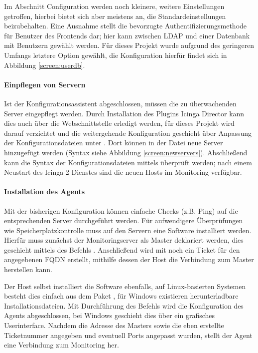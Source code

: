 Im Abschnitt \glqq{}Configuration\grqq{} werden noch kleinere, weitere Einstellungen getroffen, hierbei bietet sich aber meistens an, die Standardeinstellungen beizubehalten. Eine Ausnahme stellt die bevorzugte Authentifizierungsmethode für Benutzer des Frontends dar; hier kann zwischen \ac{LDAP} und einer Datenbank mit Benutzern gewählt werden. Für dieses Projekt wurde aufgrund des geringeren Umfangs letztere Option gewählt, die Konfiguration hierfür findet sich in Abbildung \ref{screen:userdb}.

\paragraph{Einpflegen von Servern}
Ist der Konfigurationsassistent abgeschlossen, müssen die zu überwachenden Server eingepflegt werden. Durch Installation des Plugins \glqq{}Icinga Director\grqq{} kann dies auch über die Webschnittstelle erledigt werden, für dieses Projekt wird darauf verzichtet und die weitergehende Konfiguration geschieht über Anpassung der Konfigurationsdateien unter . Dort können in der Datei  neue Server hinzugefügt werden (Syntax siehe Abbildung \ref{screen:newservers}). Abschließend kann die Syntax der Konfigurationsdateien mittels  überprüft werden; nach einem Neustart des \glqq{}Icinga 2\grqq{} Dienstes sind die neuen Hosts im Monitoring verfügbar.

\paragraph{Installation des Agents}
Mit der bisherigen Konfiguration können einfache Checks (z.B. Ping) auf die entsprechenden Server durchgeführt werden. Für aufwendigere Überprüfungen wie Speicherplatzkontrolle muss auf den Servern eine Software installiert werden. Hierfür muss zunächst der Monitoringserver als \glqq{}Master\grqq{} deklariert werden, dies geschieht mittels des Befehls . Anschließend wird mit  noch ein \glqq{}Ticket\grqq{} für den angegebenen \ac{FQDN} erstellt, mithilfe dessen der Host die Verbindung zum Master herstellen kann.

Der Host selbst installiert die Software ebenfalls, auf Linux-basierten Systemen besteht dies einfach aus dem Paket , für Windows existieren herunterladbare Installationsdateien. Mit Durchführung des Befehls  wird die Konfiguration des Agents abgeschlossen, bei Windows geschieht dies über ein grafisches Userinterface. Nachdem die Adresse des Masters sowie die eben erstellte Ticketnummer angegeben und eventuell Ports angepasst wurden, stellt der Agent eine Verbindung zum Monitoring her.

